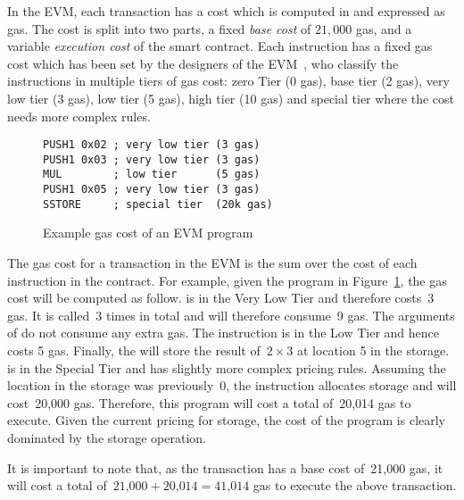 In the EVM, each transaction has a cost which is computed in and expressed as gas. The cost is split into two parts, a fixed \textit{base cost} of $21,000$ gas, and a variable \emph{execution cost} of the smart contract. 
Each instruction has a fixed gas cost which has been set by the designers of the EVM~\cite{wood2014ethereum}, who classify the instructions in multiple tiers of gas cost: zero Tier (0 gas), base tier (2 gas), very low tier (3 gas), low tier (5 gas), high tier (10 gas) and special tier where the cost needs more complex rules.
%
\begin{figure}[tb]
  \begin{center}
    \begin{minipage}{0.42\textwidth}
\begin{lstlisting}[language=esm]
PUSH1 0x02 ; very low tier (3 gas)
PUSH1 0x03 ; very low tier (3 gas)
MUL        ; low tier      (5 gas)
PUSH1 0x05 ; very low tier (3 gas)
SSTORE     ; special tier  (20k gas)
\end{lstlisting}
\end{minipage}
\caption{Example gas cost of an EVM program}
\label{list:example-gas-cost}
\end{center}
\end{figure}
%
The gas cost for a transaction in the EVM is the sum over the cost of each instruction in the contract. For example, given the program in Figure~\ref{list:example-gas-cost}, the gas cost will be computed as follow.  is in the Very Low Tier and therefore costs~3 gas. It is called~3 times in total and will therefore consume~9 gas. The arguments of  do not consume any extra gas. The  instruction is in the Low Tier and hence costs 5 gas. Finally, the  will store the result of~$2\times3$ at location 5 in the storage.  is in the Special Tier and has slightly more complex pricing rules. Assuming the location in the storage was previously~0, the instruction allocates storage and will cost~20,000 gas. Therefore, this program will cost a total of~20,014 gas to execute. Given the current pricing for storage, the cost of the program is clearly dominated by the storage operation.

It is important to note that, as the transaction has a base cost of~21,000 gas, it will cost a total of~$21\text{,}000 + 20\text{,}014 = 41\text{,}014$ gas to execute the above transaction.

